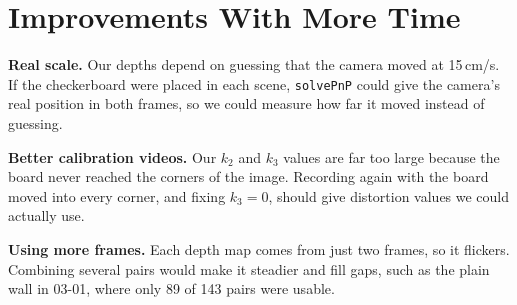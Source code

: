 \section{Improvements With More Time}
\textbf{Real scale.} Our depths depend on guessing that the camera moved at 15\,cm/s. If the
checkerboard were placed in each scene, \texttt{solvePnP} could give the camera's real position in
both frames, so we could measure how far it moved instead of guessing.

\textbf{Better calibration videos.} Our $k_2$ and $k_3$ values are far too large because the board
never reached the corners of the image. Recording again with the board moved into every corner, and
fixing $k_3=0$, should give distortion values we could actually use.

\textbf{Using more frames.} Each depth map comes from just two frames, so it flickers. Combining
several pairs would make it steadier and fill gaps, such as the plain wall in 03-01, where only 89
of 143 pairs were usable.

